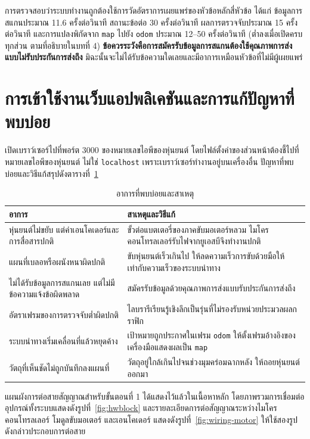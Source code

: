 \documentclass[a4paper,12pt]{report}
\begin{document}
การตรวจสอบว่าระบบทำงานถูกต้องใช้การวัดอัตราการเผยแพร่ของหัวข้อหลักสี่หัวข้อ
ได้แก่ ข้อมูลการสแกนประมาณ 11.6 ครั้งต่อวินาที
สถานะข้อต่อ 30 ครั้งต่อวินาที ผลการตรวจจับประมาณ 15 ครั้งต่อวินาที
และการแปลงพิกัดจาก \texttt{map} ไปยัง \texttt{odom} ประมาณ 12--50 ครั้งต่อวินาที
(ต่ำลงเมื่อเปิดครบทุกส่วน ตามที่อธิบายในบทที่ 4)
\textbf{ข้อควรระวังคือการสมัครรับข้อมูลการสแกนต้องใช้คุณภาพการส่งแบบไม่รับประกันการส่งถึง}
มิฉะนั้นจะไม่ได้รับข้อความใดเลยและมีอาการเหมือนหัวข้อที่ไม่มีผู้เผยแพร่

\section{การเข้าใช้งานเว็บแอปพลิเคชันและการแก้ปัญหาที่พบบ่อย}

เปิดเบราว์เซอร์ไปที่พอร์ต 3000 ของหมายเลขไอพีของหุ่นยนต์
โดยไฟล์ตั้งค่าของส่วนหน้าต้องชี้ไปที่หมายเลขไอพีของหุ่นยนต์ ไม่ใช่ \texttt{localhost}
เพราะเบราว์เซอร์ทำงานอยู่บนเครื่องอื่น
ปัญหาที่พบบ่อยและวิธีแก้สรุปดังตารางที่~\ref{tab:troubleshoot}

\begin{table}[H]
\centering
\caption[อาการที่พบบ่อยและสาเหตุ (ภาคผนวก ก)]{อาการที่พบบ่อยและสาเหตุ}
\label{tab:troubleshoot}
\small
\begin{tabularx}{\textwidth}{|>{\raggedright\arraybackslash}p{5cm}|X|}
\hline
\textbf{อาการ} & \textbf{สาเหตุและวิธีแก้} \\
\hline
หุ่นยนต์ไม่ขยับ แต่ค่าเอนโคเดอร์และการสื่อสารปกติ
 & ขั้วต่อแบตเตอรี่ของภาคขับมอเตอร์หลวม ไมโครคอนโทรลเลอร์รับไฟจากยูเอสบีจึงทำงานปกติ \\
\hline
แผนที่เบลอหรือผนังหนาผิดปกติ
 & ขับหุ่นยนต์เร็วเกินไป ให้ลดความเร็วการขับด้วยมือให้เท่ากับความเร็วของระบบนำทาง \\
\hline
ไม่ได้รับข้อมูลการสแกนเลย แต่ไม่มีข้อความแจ้งข้อผิดพลาด
 & สมัครรับข้อมูลด้วยคุณภาพการส่งแบบรับประกันการส่งถึง \\
\hline
อัตราเฟรมของการตรวจจับต่ำผิดปกติ
 & ไลบรารีเรียนรู้เชิงลึกเป็นรุ่นที่ไม่รองรับหน่วยประมวลผลกราฟิก \\
\hline
ระบบนำทางเริ่มเคลื่อนที่แล้วหยุดค้าง
 & เป้าหมายถูกประกาศในเฟรม \texttt{odom} ให้ตั้งเฟรมอ้างอิงของเครื่องมือแสดงผลเป็น \texttt{map} \\
\hline
วัตถุที่เห็นชัดไม่ถูกบันทึกลงแผนที่
 & วัตถุอยู่ใกล้เกินไปจนช่วงมุมคร่อมฉากหลัง ให้ถอยหุ่นยนต์ออกมา \\
\hline
\end{tabularx}
\end{table}

แผนผังการต่อสายสัญญาณสำหรับขั้นตอนที่ 1 ได้แสดงไว้แล้วในเนื้อหาหลัก โดยภาพรวมการเชื่อมต่ออุปกรณ์ทั้งระบบแสดงดังรูปที่~\ref{fig:hwblock} และรายละเอียดการต่อสัญญาณระหว่างไมโครคอนโทรลเลอร์ โมดูลขับมอเตอร์ และเอนโคเดอร์ แสดงดังรูปที่~\ref{fig:wiring-motor} ให้ใช้สองรูปดังกล่าวประกอบการต่อสาย
\end{document}
